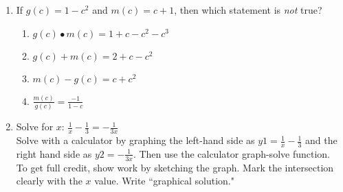 \documentclass[12pt, oneside]{article}
\begin{document}
\begin{enumerate}
\newpage


\item If $g(c)=1-c^2$ and $m(c)=c+1$, then which statement is \emph{not} true?
\begin{enumerate}
    \item $g(c) \bullet m(c) = 1+c-c^2-c^3$
    \item $g(c) + m(c) = 2+c-c^2$
    \item $m(c) - g(c) = c+c^2$
    \item $\displaystyle \frac{m(c)}{g(c)} = \frac{-1}{1-c}$
\end{enumerate} %


\item Solve for $x$: $\displaystyle \frac{1}{x} - \frac{1}{3} =-\frac{1}{3x}$\\[10pt]%
Solve with a calculator by graphing the left-hand side as $\displaystyle y1=\frac{1}{x} - \frac{1}{3}$ and the right hand side as $y2=-\frac{1}{3x}$. Then use the calculator graph-solve function.\\[1in]
To get full credit, show work by sketching the graph. Mark the intersection clearly with the $x$ value. Write ``graphical solution."
\begin{center}
\end{center}

\newpage

\end{enumerate}
\end{document}
